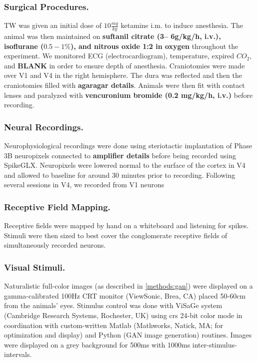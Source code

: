 \subsubsection*{Surgical Procedures.}
TW was given an initial dose of \textbf{$10 \frac{mg}{kg}$} ketamine i.m. to induce anesthesia. The animal was then maintained on \textbf{suftanil citrate (3– 6g/kg/h, i.v.), isoflurane ($0.5-1\%$), and nitrous oxide 1:2 in oxygen} throughout the experiment. We monitored ECG (electrocardiogram), temperature, expired $CO_2$, and \textbf{BLANK} in order to ensure depth of anesthesia. Craniotomies were made over V1 and V4 in the right hemisphere. The dura was reflected and then the craniotomies filled with \textbf{agaragar details}. Animals were then fit with contact lenses and paralyzed with \textbf{vencuronium bromide (0.2 mg/kg/h, i.v.)} before recording.

\subsubsection*{Neural Recordings.}
Neurophysiological recordings were done using steriotactic implantation of Phase 3B neuropixels \parencite{Jun2017} connected to \textbf{amplifier details} before being recorded using SpikeGLX. Neuropixels were lowered normal to the surface of the cortex in V4 and allowed to baseline for around 30 minutes prior to recording. Following several sessions in V4, we recorded from V1 neurons 

\subsubsection*{Receptive Field Mapping.}
Receptive fields were mapped by hand on a whiteboard and listening for spikes. Stimuli were then sized to best cover the conglomerate receptive fields of simultaneously recorded neurons.

\subsubsection*{Visual Stimuli.}
Naturalistic full-color images (as described in \ref{methods:gan}) were displayed on a gamma-calibrated 100Hz CRT monitor (ViewSonic, Brea, CA) placed 50-60cm from the animals' eyes. Stimulus control was done with ViSaGe system (Cambridge Research Systems, Rochester, UK) using crs 24-bit color mode in coordination with custom-written Matlab (Mathworks, Natick, MA; for optimization and display) and Python (GAN image generation) routines. Images were displayed on a grey background for 500ms with 1000ms inter-stimulus-intervals. 

